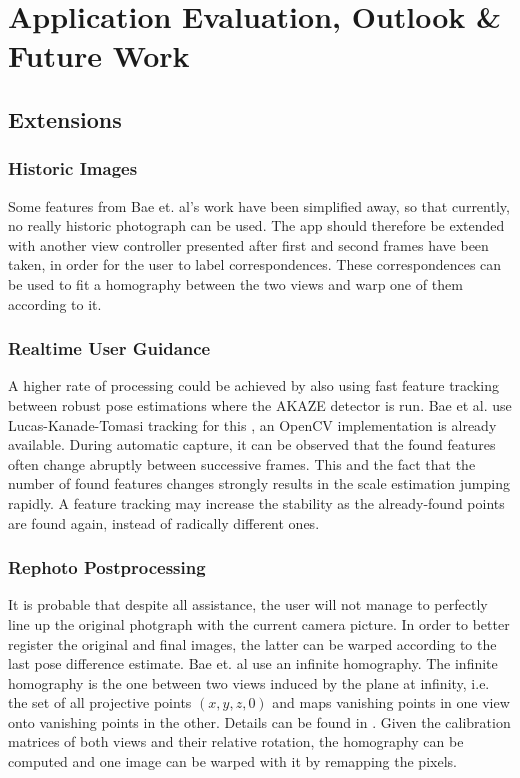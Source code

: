 \chapter{Application Evaluation, Outlook \& Future Work}\label{ch:outlook}

\section{Extensions}

\subsection*{Historic Images}

Some features from Bae et. al's work have been simplified away, so that
currently, no really historic photograph can be used. The app should therefore
be extended with another view controller presented after first and second frames
have been taken, in order for the user to label correspondences. These
correspondences can be used to fit a homography between the two views and warp
one of them according to it.

\subsection*{Realtime User Guidance}

A higher rate of processing could be achieved by also using fast feature
tracking between robust pose estimations where the AKAZE detector is run. Bae et
al. use Lucas-Kanade-Tomasi tracking for this \citep{lucas1981,tomasi1991}, an
OpenCV implementation is already available. During automatic capture, it can be
observed that the found features often change abruptly between successive
frames. This and the fact that the number of found features changes strongly
results in the scale estimation jumping rapidly. A feature tracking may increase
the stability as the already-found points are found again, instead of radically
different ones.

\subsection*{Rephoto Postprocessing}

It is probable that despite all assistance, the user will not manage to
perfectly line up the original photgraph with the current camera picture.  In
order to better register the original and final images, the latter can be warped
according to the last pose difference estimate. Bae et. al use an infinite
homography. The infinite homography is the one between two views induced by the
plane at infinity, i.e.  the set of all projective points $(x,y,z,0)$ and maps
vanishing points in one view onto vanishing points in the other. Details can be
found in \citep[ch. 13.4]{h&z2004}.  Given the calibration matrices of both
views and their relative rotation, the homography can be computed and one image
can be warped with it by remapping the pixels.

